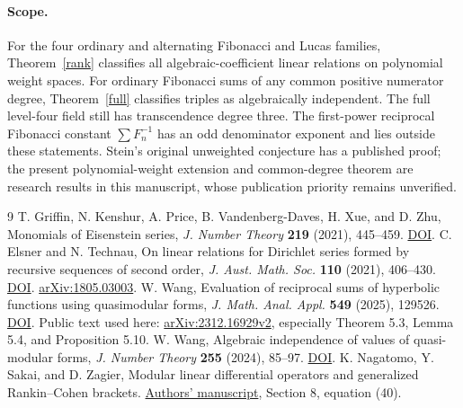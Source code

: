 \documentclass[11pt]{article}
\begin{document}
\clearpage
\paragraph{Scope.}
For the four ordinary and alternating Fibonacci and Lucas families, Theorem~\ref{rank} classifies all algebraic-coefficient linear relations on polynomial weight spaces. For ordinary Fibonacci sums of any common positive numerator degree, Theorem~\ref{full} classifies triples as algebraically independent. The full level-four field still has transcendence degree three. The first-power reciprocal Fibonacci constant $\sum F_n^{-1}$ has an odd denominator exponent and lies outside these statements. Stein's original unweighted conjecture has a published proof; the present polynomial-weight extension and common-degree theorem are research results in this manuscript, whose publication priority remains unverified.

\begin{thebibliography}{9}
 T. Griffin, N. Kenshur, A. Price, B. Vandenberg-Daves, H. Xue, and D. Zhu, Monomials of Eisenstein series, \emph{J. Number Theory} \textbf{219} (2021), 445--459. \href{https://doi.org/10.1016/j.jnt.2020.09.002}{DOI}.
 C. Elsner and N. Technau, On linear relations for Dirichlet series formed by recursive sequences of second order, \emph{J. Aust. Math. Soc.} \textbf{110} (2021), 406--430. \href{https://doi.org/10.1017/S1446788719000491}{DOI}. \href{https://arxiv.org/abs/1805.03003}{arXiv:1805.03003}.
 W. Wang, Evaluation of reciprocal sums of hyperbolic functions using quasimodular forms, \emph{J. Math. Anal. Appl.} \textbf{549} (2025), 129526. \href{https://doi.org/10.1016/j.jmaa.2025.129526}{DOI}. Public text used here: \href{https://arxiv.org/html/2312.16929v2}{arXiv:2312.16929v2}, especially Theorem 5.3, Lemma 5.4, and Proposition 5.10.
 W. Wang, Algebraic independence of values of quasi-modular forms, \emph{J. Number Theory} \textbf{255} (2024), 85--97. \href{https://doi.org/10.1016/j.jnt.2023.08.010}{DOI}.
 K. Nagatomo, Y. Sakai, and D. Zagier, Modular linear differential operators and generalized Rankin--Cohen brackets. \href{https://people.mpim-bonn.mpg.de/zagier/files/preprints/MLDO.pdf}{Authors' manuscript}, Section 8, equation (40).
\end{thebibliography}
\end{document}
